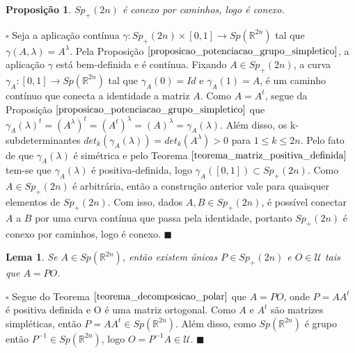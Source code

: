 \documentclass[12pt]{book}
\newtheorem{lema}[teorema]{Lema}
\newtheorem{proposicao}[teorema]{Proposição}
\newenvironment{prova}[1]{$\square$ #1}{\hfill$\blacksquare$}
\newcommand{\gruposimpletico}[1]{Sp(#1)}
\newcommand{\gruposimpleticopositivo}[1]{Sp_{+}(#1)}
\newcommand{\matrizSimpleticaOrtogonal}{\mathcal{U}}
\newcommand{\real}[1]{\mathbb{R}^{#1}}
\begin{document}
	\begin{proposicao}
		$\gruposimpleticopositivo{2n}$ é conexo por caminhos, logo é conexo.
	\end{proposicao}
	\begin{prova}
		Seja a aplicação contínua $\gamma:\gruposimpleticopositivo{2n}\times [0,1] \to \gruposimpletico{\real{2n}}$ tal que $\gamma(A,\lambda) = A^{\lambda}$. Pela Proposição $\ref{proposicao_potenciacao_grupo_simpletico}$, a aplicação $\gamma$ está bem-definida e é contínua. Fixando $A \in \gruposimpleticopositivo{2n}$, 	a curva $\gamma_{A}:[0,1]\to \gruposimpletico{\real{2n}}$ tal que $\gamma_{A}(0) = Id$ e $\gamma_{A}(1) = A$, é um caminho contínuo que conecta a identidade a matriz $A$. Como $A=A^{t}$, segue da Proposição $\ref{proposicao_potenciacao_grupo_simpletico}$ que $\gamma_{A}(\lambda)^{t} = (A^{\lambda})^{t} = (A^{t})^{\lambda} = (A)^{\lambda} = \gamma_{A}(\lambda)$. Além disso, os k-subdeterminantes $det_{k}(\gamma_{A}(\lambda)) = det_{k}(A^{\lambda}) > 0$ para $1\leq k \leq 2n$. Pelo fato de que $\gamma_{A}(\lambda)$ é simétrica e pelo Teorema $\ref{teorema_matriz_positiva_definida}$ tem-se que $\gamma_{A}(\lambda)$ é positiva-definida, logo $\gamma_{A}([0,1]) \subset \gruposimpleticopositivo{2n}$. Como $A \in \gruposimpleticopositivo{2n}$ é arbitrária, então a construção anterior vale para quaisquer elementos de $\gruposimpleticopositivo{2n}$. Com isso, dados $A, B \in \gruposimpleticopositivo{2n}$, é possível conectar $A$ a $B$ por uma curva contínua que passa pela identidade, portanto $\gruposimpleticopositivo{2n}$ é conexo por caminhos, logo é conexo.
	\end{prova}	
	
	\begin{lema}\label{lema_decomposicao_grupo_simpletico_positivo}
		Se $A \in \gruposimpletico{\real{2n}}$, então existem únicas $P \in \gruposimpleticopositivo{2n}$ e $O \in \matrizSimpleticaOrtogonal$ tais que $A=PO$.
	\end{lema}
	\begin{prova}
		Segue do Teorema $\ref{teorema_decomposicao_polar}$ que $A=PO$, onde $P=AA^t$ é positiva definida e O é uma matriz ortogonal. Como $A$ e $A^{t} $ são matrizes simpléticas, então $P=AA^{t}\in \gruposimpletico{\real{2n}}$. 
		Além disso, como $\gruposimpletico{\real{2n}}$ é grupo então $P^{-1}\in \gruposimpletico{\real{2n}}$, logo $O=P^{-1}A \in \mathcal{U}$.
	\end{prova}
	
\end{document}
